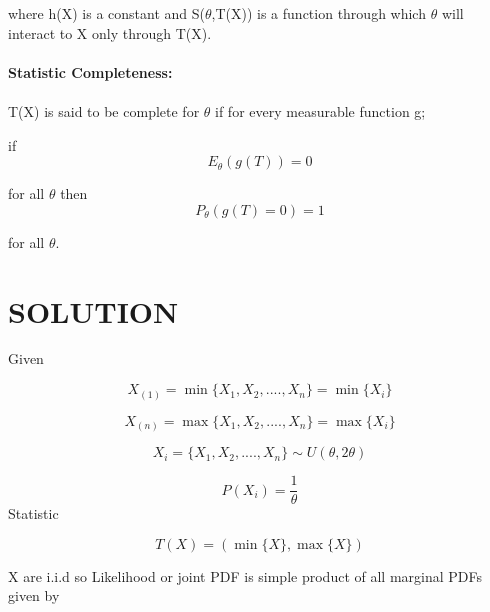 \documentclass[journal,12pt,twocolumn]{IEEEtran}
\begin{document}
where h(X) is a constant and S($\theta$,T(X)) is a function through which $\theta$ will interact to X only through T(X).\\ \\

\textbf{Statistic Completeness:}\\ \\
T(X) is said to be complete for $\theta$ if for every measurable function g;

if 
\begin{equation}
    {E_\theta}(g(T))=0 
\end{equation}

for all $\theta$ then
\begin{equation}
    P_\theta(g(T)=0)=1 
\end{equation}

for all $\theta$.\\
\section{\textbf{SOLUTION}}
Given

\begin{equation}
    X_{(1)} =\min\{X_1,X_2,....,X_n\}=\min\{X_i\}
\end{equation}

\begin{equation}
    X_{(n)}=\max\{X_1,X_2,....,X_n\}=\max\{X_i\}
\end{equation}

\begin{equation}
    X_i=\{X_1,X_2,....,X_n\}\sim U(\theta,2\theta)
\end{equation}

\begin{equation}
    P(X_i)=\dfrac{1}{\theta}
\end{equation}
Statistic

\begin{equation}
    T(X)=(\min\{X\},\max\{X\})
\end{equation}

X are i.i.d so Likelihood or joint PDF is simple product of all marginal PDFs given by 
\end{document}
